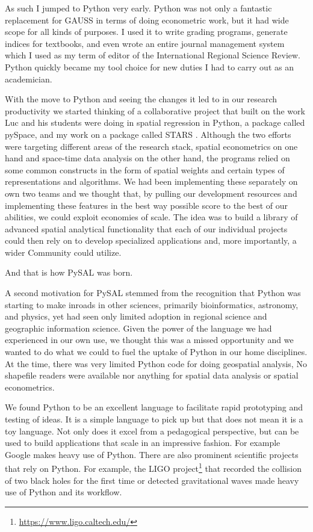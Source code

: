 \documentclass[11pt]{article}
\begin{document}
As such I jumped to Python very early. Python was not only a fantastic
replacement for GAUSS in terms of doing econometric work, but it had wide scope
for all kinds of purposes. I used it to write grading programs, generate
indices for textbooks, and even wrote an entire journal management system which
I used as my term of editor of the International Regional Science Review.
Python quickly became my tool choice for new duties I had to carry out as an
academician. 

With the move to Python and seeing the changes it led to in our research
productivity we started thinking of a collaborative project that built on the
work Luc and his students were doing in spatial regression in Python, a package
called pySpace, and my work on a package called STARS \citep{rey_stars:_2006-3}.
Although the two efforts were targeting different areas of the research stack,
spatial econometrics on one hand and space-time data analysis on the other
hand, the programs relied on some common constructs in the form of spatial
weights and certain types of representations and algorithms. We had been
implementing these separately on own two teams and we thought that, by
pulling our development resources and implementing these features in the best
way possible score to the best of our abilities, we could exploit economies of
scale. The idea was to build a library of advanced spatial analytical
functionality that each of our individual projects could then rely on to develop
specialized applications and, more importantly, a wider Community could
utilize.


And that is how PySAL was born.

A second motivation for PySAL stemmed from the recognition that Python was
starting to make inroads in other sciences, primarily bioinformatics,
astronomy, and physics, yet had seen only limited adoption in regional science
and geographic information science. Given the power of the language we had
experienced in our own use, we thought this was a missed opportunity and we
wanted to do what we could to fuel the uptake of Python in our home
disciplines. At the time, there was very limited Python code for doing
geospatial analysis, No shapefile readers were available nor anything for
spatial data analysis or spatial econometrics.

We found Python to be an excellent language to facilitate rapid prototyping and
testing of ideas. It is a simple language to pick up but that does not mean it
is a toy language. Not only does it excel from a pedagogical perspective, but
can be used to build applications that scale in an impressive fashion. For
example Google makes heavy use of Python. There are also prominent scientific
projects that rely on Python. For example, the LIGO project\footnote{\url{ https://www.ligo.caltech.edu/}} that recorded
the collision of two black holes for the first time or detected gravitational
waves made heavy use of Python and its workflow.
\end{document}
